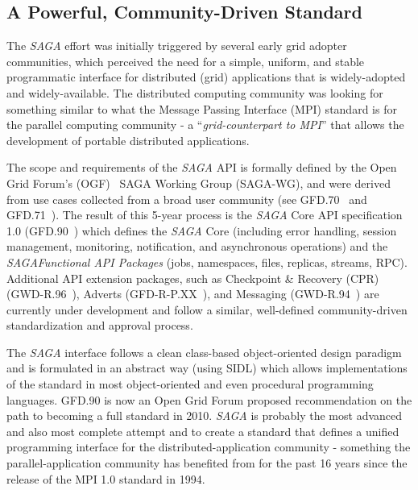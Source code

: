 \documentclass[a4paper,10pt]{article}
\newcommand{\sagaspec}{\textit{SAGA}\xspace}
\newcommand{\spec}{\sagaspec}
\begin{document}
\vspace{-0.8em}

\subsection*{A Powerful, Community-Driven Standard}
\vspace{-0.5em}
 The \spec effort was initially triggered by several early grid adopter communities, which perceived the need for a simple, uniform, and stable programmatic interface for distributed (grid) applications that is widely-adopted and widely-available. The distributed computing community was looking for something similar to what the Message Passing Interface (MPI) standard is for the parallel computing community - a ``\textit{grid-counterpart to MPI}'' that allows the development of portable distributed applications.
 
 
 The scope and requirements of the \spec API is
 formally defined by the Open Grid Forum's (OGF)~\cite{ogf} SAGA Working Group (SAGA-WG), and were
 derived from use cases collected from a broad user community (see
 GFD.70~\cite{ogf-gfd-70} and GFD.71~\cite{ogf-gfd-71}). The result
 of this 5-year process is the \spec Core API
 specification 1.0 (GFD.90~\cite{ogf-gfd-90}) which defines the \spec
 Core (including error handling, session management, monitoring,
 notification, and asynchronous operations) and the \spec \textit{Functional API
 Packages} (jobs, namespaces, files, replicas, streams, RPC).
  Additional API extension packages, such as
 Checkpoint \& Recovery (CPR) (GWD-R.96~\cite{ogf-gwd-r-96}), Adverts
 (GFD-R-P.XX~\cite{ogf-gwd-r-p-xx}), and Messaging
 (GWD-R.94~\cite{ogf-gwd-r-94}) are currently under development and
 follow a similar, well-defined community-driven standardization and
 approval process. 

 
The \spec interface follows a clean class-based object-oriented design paradigm and is 
 formulated in an abstract way (using SIDL) which allows implementations of the standard in
 most object-oriented and even procedural programming languages. GFD.90 is now an Open Grid Forum proposed recommendation on the path to becoming a full standard in 2010. \spec is probably the most advanced and also most complete attempt and to create a standard that defines a unified programming interface for the distributed-application community - something the parallel-application community has benefited from for the past 16 years since the release of the MPI 1.0 standard in 1994. 
 
\end{document}
